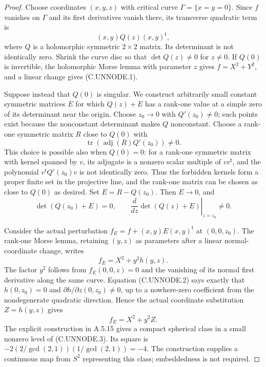 \begin{proof}
Choose coordinates $(x,y,z)$ with critical curve
$\Gamma=\{x=y=0\}$. Since $f$ vanishes on $\Gamma$ and
its first derivatives vanish there, its transverse
quadratic term is
\[
                  (x,y)Q(z)(x,y)^{\mathsf t},
\]
where $Q$ is a holomorphic symmetric $2\times2$ matrix.
Its determinant is not identically zero. Shrink the
curve disc so that $\det Q(z)\ne0$ for $z\ne0$.
If $Q(0)$ is invertible, the holomorphic Morse lemma
with parameter $z$ gives $f=X^2+Y^2$, and a linear
change gives (C.UNNODE.1).

Suppose instead that $Q(0)$ is singular. We construct
arbitrarily small constant symmetric matrices $E$
for which $Q(z)+E$ has a rank-one value at a simple
zero of its determinant near the origin. Choose
$z_0\to0$ with $Q'(z_0)\ne0$; such points exist
because the nonconstant determinant makes $Q$
nonconstant. Choose a rank-one symmetric matrix
$R$ close to $Q(0)$ with
\[
                  \operatorname{tr}
                      (\operatorname{adj}(R)Q'(z_0))\ne0.
\]
This choice is possible also when $Q(0)=0$: for a
rank-one symmetric matrix with kernel spanned by
$v$, its adjugate is a nonzero scalar multiple of
$vv^{\mathsf t}$, and the polynomial
$v^{\mathsf t}Q'(z_0)v$ is not identically zero.
Thus the forbidden kernels form a proper finite
set in the projective line, and the rank-one
matrix can be chosen as close to $Q(0)$ as desired.
Set $E=R-Q(z_0)$. Then $E\to0$, and
\[
 \det(Q(z_0)+E)=0,\qquad
 \left.\frac{d}{dz}\det(Q(z)+E)\right|_{z=z_0}\ne0.
 \tag{C.UNNODE.2}
\]

Consider the actual perturbation
$f_E=f+(x,y)E(x,y)^{\mathsf t}$ at $(0,0,z_0)$.
The rank-one Morse lemma, retaining $(y,z)$ as
parameters after a linear normal-coordinate change,
writes
\[
                         f_E=X^2+y^2h(y,z).
\]
The factor $y^2$ follows from $f_E(0,0,z)=0$ and
the vanishing of its normal first derivative along
the same curve. Equation (C.UNNODE.2) says exactly
that $h(0,z_0)=0$ and $\partial h/\partial z(0,z_0)
\ne0$, up to a nowhere-zero coefficient from the
nondegenerate quadratic direction. Hence the actual
coordinate substitution $Z=h(y,z)$ gives
\[
                            f_E=X^2+y^2Z.          \tag{C.UNNODE.3}
\]
The explicit construction in A.5.15 gives a compact
spherical class in a small nonzero level of
(C.UNNODE.3). Its square is
$-2(2/\gcd(2,1))(1/\gcd(2,1))=-4$.
The construction supplies a continuous map from
$S^2$ representing this class; embeddedness is
not required.


\end{proof}
